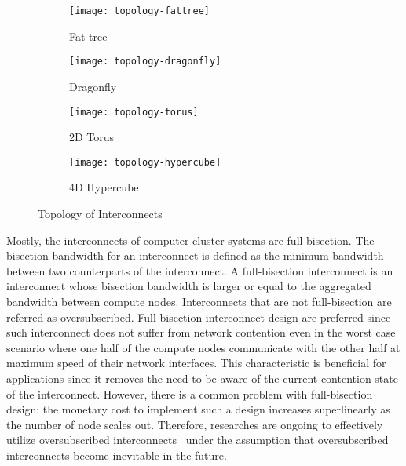 \begin{figure}
    \centering
    \begin{subfigure}{.45\linewidth}
        \centering
        \texttt{[image: topology-fattree]}
        \caption{Fat-tree}%
        \label{fig:topology-fattree}
    \end{subfigure}
    \begin{subfigure}{.45\linewidth}
        \centering
        \texttt{[image: topology-dragonfly]}
        \caption{Dragonfly}%
        \label{fig:topology-dragonfly}
    \end{subfigure}
    \par\bigskip
    \begin{subfigure}{.45\linewidth}
        \centering
        \texttt{[image: topology-torus]}
        \caption{2D Torus}%
        \label{fig:topology-torus}
    \end{subfigure}
    \begin{subfigure}{.45\linewidth}
        \centering
        \texttt{[image: topology-hypercube]}
        \caption{4D Hypercube}%
        \label{fig:topology-hypercube}
    \end{subfigure}
    \caption{Topology of Interconnects}%
    \label{fig:topology}
\end{figure}

Mostly, the interconnects of computer cluster systems are full-bisection.
The bisection bandwidth for an interconnect is defined as the minimum
bandwidth between two counterparts of the interconnect. A full-bisection
interconnect is an interconnect whose bisection bandwidth is larger or equal
to the aggregated bandwidth between compute nodes. Interconnects that are
not full-bisection are referred as oversubscribed. Full-bisection interconnect
design are preferred since such interconnect does not suffer from network
contention even in the worst case scenario where one half of the compute nodes
communicate with the other half at maximum speed of their network interfaces.
This characteristic is beneficial for applications since it removes the need
to be aware of the current contention state of the interconnect. However,
there is a common problem with full-bisection design: the monetary cost to
implement such a design increases superlinearly as the number of node scales
out. Therefore, researches are ongoing to effectively utilize oversubscribed
interconnects~\autocite{Leon2017,Michelogiannakis2017} under the assumption
that oversubscribed interconnects become inevitable in the future.

